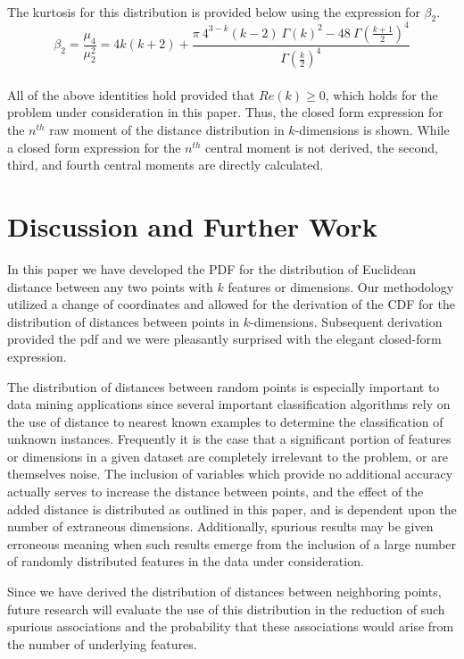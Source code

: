 \documentclass[11pt]{article} %
\begin{document}
%
\\
\indent The kurtosis for this distribution is provided below using the expression for $\beta_2$.
%
$$\beta_2 = \frac{\mu_4}{\mu^{2}_2} = 4k(k + 2) + \frac{\pi \ 4^{3-k}(k-2) \  \Gamma(k)^2 - 48 \ \Gamma(\frac{k+1}{2})^4}{\Gamma(\frac{k}{2})^4}
$$
%
\\
\indent All of the above identities hold provided that $Re(k) \ge 0$, which holds for the problem under consideration in this paper.  Thus, the closed form expression for the $n^{th}$ raw moment of the distance distribution in $k$-dimensions is shown.  While a closed form expression for the $n^{th}$ central moment is not derived, the second, third, and fourth central moments are directly calculated. \\


\section{Discussion and Further Work}
In this paper we have developed the PDF for the distribution of Euclidean distance between any two points with $k$ features or dimensions.  Our methodology utilized a change of coordinates and allowed for the derivation of the CDF for the distribution of distances between points in $k$-dimensions.  Subsequent derivation provided the pdf and we were pleasantly surprised with the elegant closed-form expression.


The distribution of distances between random points is especially important to data mining applications since several important classification algorithms rely on the use of distance to nearest known examples to determine the classification of unknown instances.  Frequently it is the case that a significant portion of features or dimensions in a given dataset are completely irrelevant to the problem, or are themselves noise. The inclusion of variables which provide no additional accuracy actually serves to increase the distance between points, and the effect of the added distance is distributed as outlined in this paper, and is dependent upon the number of extraneous dimensions.  Additionally, spurious results may be given erroneous meaning when such results emerge from the inclusion of a large number of randomly distributed features in the data under consideration.  

Since we have derived the distribution of distances between neighboring points, future research will evaluate the use of this distribution in the reduction of such spurious associations and the probability that these associations would arise from the number of underlying features.
\end{document}
